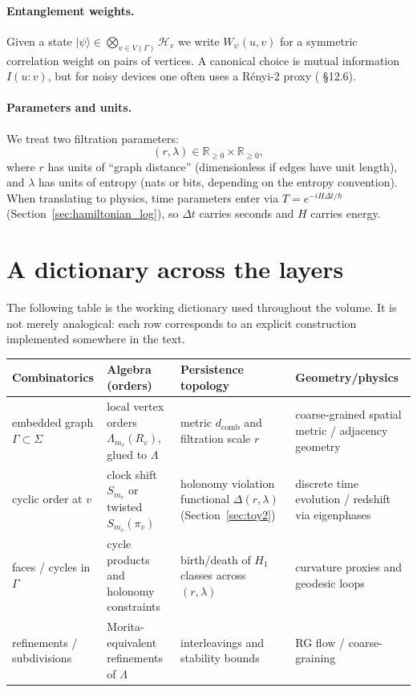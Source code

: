 \documentclass[11pt,oneside]{amsbook}
\numberwithin{equation}{section}
\theoremstyle{plain}
\theoremstyle{definition}
\theoremstyle{remark}
\newcommand{\RR}{\mathbb{R}}
\newcommand{\cH}{\mathcal{H}}
\begin{document}
\paragraph{Entanglement weights.}
Given a state $|\psi\rangle\in\bigotimes_{v\in V(\Gamma)}\cH_v$ we write $W_\psi(u,v)$ for a symmetric correlation weight on pairs of vertices.
A canonical choice is mutual information $I(u\!:\!v)$, but for noisy devices one often uses a Rényi-2 proxy ( \S12.6).

\paragraph{Parameters and units.}
We treat two filtration parameters:
\[
(r,\lambda)\in\RR_{\ge 0}\times\RR_{\ge 0},
\]
where $r$ has units of ``graph distance'' (dimensionless if edges have unit length), and $\lambda$ has units of entropy (nats or bits, depending on the entropy convention).
When translating to physics, time parameters enter via $T=e^{-iH\Delta t/\hbar}$ (Section~\ref{sec:hamiltonian_log}), so $\Delta t$ carries seconds and $H$ carries energy.

\section*{A dictionary across the layers}

The following table is the working dictionary used throughout the volume.
It is not merely analogical: each row corresponds to an explicit construction implemented somewhere in the text.

\begin{longtable}{p{}p{}p{}p{}}
\toprule
\textbf{Combinatorics} & \textbf{Algebra (orders)} & \textbf{Persistence topology} & \textbf{Geometry/physics}\\
\midrule
embedded graph $\Gamma\subset\Sigma$ &
local vertex orders $\Lambda_{m_v}(R_v)$, glued to $\Lambda$ &
metric $d_{\mathrm{comb}}$ and filtration scale $r$ &
coarse-grained spatial metric / adjacency geometry\\
\addlinespace
cyclic order at $v$ &
clock shift $S_{m_v}$ or twisted $S_{m_v}(\pi_v)$ &
holonomy violation functional $\Delta(r,\lambda)$ (Section~\ref{sec:toy2}) &
discrete time evolution / redshift via eigenphases\\
\addlinespace
faces / cycles in $\Gamma$ &
cycle products and holonomy constraints &
birth/death of $H_1$ classes across $(r,\lambda)$ &
curvature proxies and geodesic loops\\
\addlinespace
refinements / subdivisions &
Morita-equivalent refinements of $\Lambda$ &
interleavings and stability bounds &
RG flow / coarse-graining\\
\bottomrule
\end{longtable}
\end{document}
